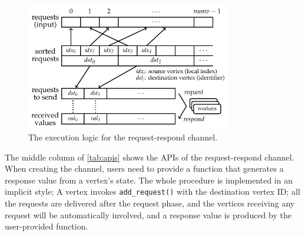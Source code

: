 \documentclass{sokendai_thesis} %
\begin{document}

\begin{figure}[t]
 \centering
 \includegraphics[width=0.8\textwidth]{figures/reqresp-impl.pdf}
 \caption{The execution logic for the request-respond channel.}%
 \label{fig:reqresp-impl}
\end{figure}

The middle column of \autoref{tab:apis} shows the APIs of the request-respond channel.
When creating the channel, users need to provide a function that generates a response value from a vertex's state.
The whole procedure is implemented in an implicit style; A vertex invokes \texttt{add\_request()} with the destination vertex ID;
all the requests are delivered after the request phase, and the vertices receiving any request will be automatically involved, and a response value is produced by the user-provided function.

\end{document}
